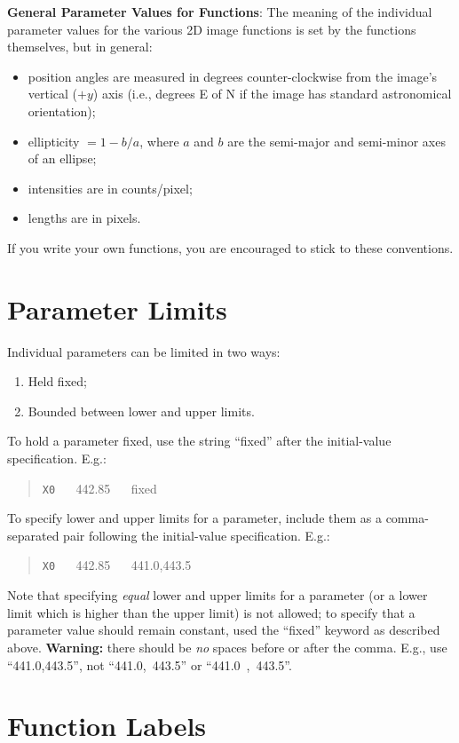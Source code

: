 \documentclass[10pt,a4paper,article]{memoir}
\begin{document}
\bigskip

\textbf{General Parameter Values for Functions}: The meaning of the individual
parameter values for the various 2D image functions is set by the functions
themselves, but in general: 
\begin{itemize}
\item position angles are measured in degrees counter-clockwise
from the image's vertical ($+y$) axis (i.e., degrees E of N if the image has standard
astronomical orientation);
\item ellipticity $= 1 - b/a$, where $a$ and $b$ are the
semi-major and semi-minor axes of an ellipse;
\item intensities are in counts/pixel;
\item lengths are in pixels. 
\end{itemize}
If you write your own functions, you are encouraged
to stick to these conventions.

\section{Parameter Limits}\label{sec:param-limits}

Individual parameters can be limited in two ways:
\begin{enumerate}
\item Held fixed;
\item Bounded between lower and upper limits.
\end{enumerate}
To hold a parameter fixed, use the string ``fixed'' after the initial-value
specification. E.g.:
\begin{quote}
\texttt{X0} ~~ 442.85 ~~ fixed
\end{quote}
To specify lower and upper limits for a parameter, include them as a comma-separated
pair following the initial-value specification. E.g.:
\begin{quote}
\texttt{X0} ~~ 442.85 ~~ 441.0,443.5
\end{quote}
Note that specifying \textit{equal} lower and upper limits for a parameter (or a lower limit
which is higher than the upper limit) is not allowed; to specify that a parameter
value should remain constant, used the ``fixed'' keyword as described above.
\textbf{Warning:} there should be \textit{no} spaces before or after the comma. E.g., use ``441.0,443.5'',
not ``441.0,~443.5'' or ``441.0~,~443.5''.


\section{Function Labels}
\end{document}
